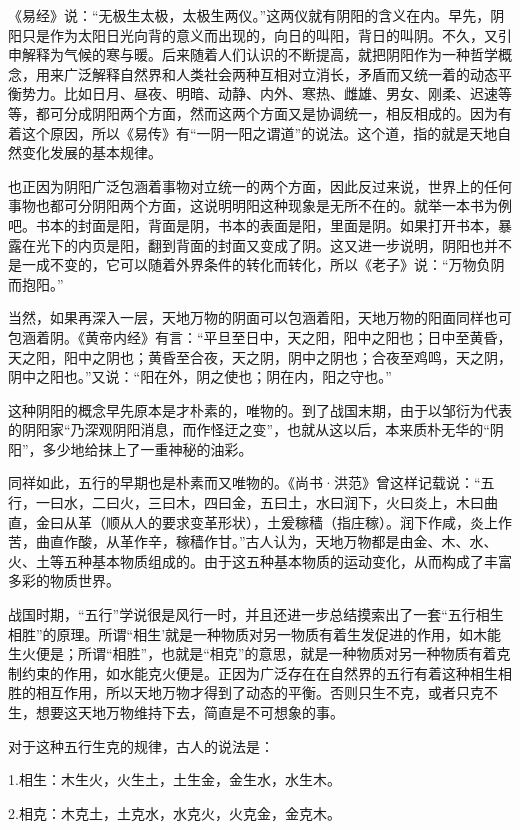 \documentclass[a5paper,oneside,12pt]{ctexbook}
\begin{document}
《易经》说：“无极生太极，太极生两仪。”这两仪就有阴阳的含义在内。早先，阴阳只是作为太阳日光向背的意义而出现的，向日的叫阳，背日的叫阴。不久，又引申解释为气候的寒与暖。后来随着人们认识的不断提高，就把阴阳作为一种哲学概念，用来广泛解释自然界和人类社会两种互相对立消长，矛盾而又统一着的动态平衡势力。比如日月、昼夜、明暗、动静、内外、寒热、雌雄、男女、刚柔、迟速等等，都可分成阴阳两个方面，然而这两个方面又是协调统一，相反相成的。因为有着这个原因，所以《易传》有“一阴一阳之谓道”的说法。这个道，指的就是天地自然变化发展的基本规律。

也正因为阴阳广泛包涵着事物对立统一的两个方面，因此反过来说，世界上的任何事物也都可分阴阳两个方面，这说明明阳这种现象是无所不在的。就举一本书为例吧。书本的封面是阳，背面是阴，书本的表面是阳，里面是阴。如果打开书本，暴露在光下的内页是阳，翻到背面的封面又变成了阴。这又进一步说明，阴阳也并不是一成不变的，它可以随着外界条件的转化而转化，所以《老子》说：“万物负阴而抱阳。”

当然，如果再深入一层，天地万物的阴面可以包涵着阳，天地万物的阳面同样也可包涵着阴。《黄帝内经》有言：“平旦至日中，天之阳，阳中之阳也；日中至黄昏，天之阳，阳中之阴也；黄昏至合夜，天之阴，阴中之阴也；合夜至鸡鸣，天之阴，阴中之阳也。”又说：“阳在外，阴之使也；阴在内，阳之守也。”

这种阴阳的概念早先原本是才朴素的，唯物的。到了战国末期，由于以邹衍为代表的阴阳家“乃深观阴阳消息，而作怪迂之变”，也就从这以后，本来质朴无华的“阴阳”，多少地给抹上了一重神秘的油彩。

同祥如此，五行的早期也是朴素而又唯物的。《尚书·洪范》曾这样记载说：“五行，一曰水，二曰火，三曰木，四曰金，五曰土，水曰润下，火曰炎上，木曰曲直，金曰从革（顺从人的要求变革形状），土爰稼穑（指庄稼）。润下作咸，炎上作苦，曲直作酸，从革作辛，稼穑作甘。”古人认为，天地万物都是由金、木、水、火、土等五种基本物质组成的。由于这五种基本物质的运动变化，从而构成了丰富多彩的物质世界。

战国时期，“五行”学说很是风行一时，并且还进一步总结摸索出了一套“五行相生相胜”的原理。所谓“相生'就是一种物质对另一物质有着生发促进的作用，如木能生火便是；所谓“相胜”，也就是“相克”的意思，就是一种物质对另一种物质有着克制约束的作用，如水能克火便是。正因为广泛存在在自然界的五行有着这种相生相胜的相互作用，所以天地万物才得到了动态的平衡。否则只生不克，或者只克不生，想要这天地万物维持下去，简直是不可想象的事。

对于这种五行生克的规律，古人的说法是：

1.相生：木生火，火生土，土生金，金生水，水生木。

2.相克：木克土，土克水，水克火，火克金，金克木。
\end{document}
